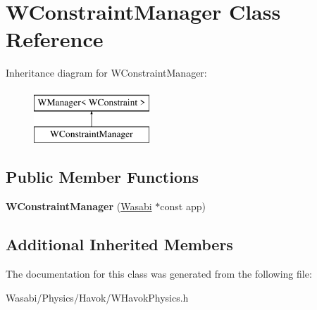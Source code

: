 \hypertarget{class_w_constraint_manager}{}\section{W\+Constraint\+Manager Class Reference}
\label{class_w_constraint_manager}
Inheritance diagram for W\+Constraint\+Manager\+:\begin{figure}[H]
\begin{center}
\leavevmode
\includegraphics[height=2.000000cm]{class_w_constraint_manager}
\end{center}
\end{figure}
\subsection*{Public Member Functions}
\begin{DoxyCompactItemize}
\item 
{\bfseries W\+Constraint\+Manager} (\hyperlink{class_wasabi}{Wasabi} $\ast$const app)\hypertarget{class_w_constraint_manager_a506ce1985f9d98a530f7ad7c42f8e59f}{}\label{class_w_constraint_manager_a506ce1985f9d98a530f7ad7c42f8e59f}

\end{DoxyCompactItemize}
\subsection*{Additional Inherited Members}


The documentation for this class was generated from the following file\+:\begin{DoxyCompactItemize}
\item 
Wasabi/\+Physics/\+Havok/W\+Havok\+Physics.\+h\end{DoxyCompactItemize}
